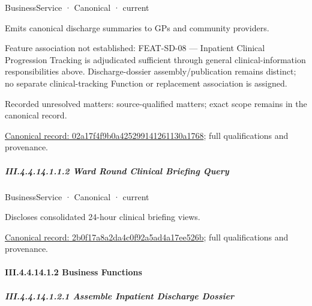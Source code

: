 \label{element:02a17f4f9b0a425299141261130a1768}
{\small BusinessService · Canonical · current}\par

Emits canonical discharge summaries to GPs and community providers.



Feature association not established: FEAT-SD-08 — Inpatient Clinical Progression Tracking is adjudicated sufficient through general clinical-information responsibilities above. Discharge-dossier assembly/publication remains distinct; no separate clinical-tracking Function or replacement association is assigned.


{\small Recorded unresolved matters: source-qualified matters; exact scope remains in the canonical record.}\par
{\footnotesize \href{../../../../../../../continuum/business/business-service/02a17f4f9b0a425299141261130a1768.md}{Canonical record: 02a17f4f9b0a425299141261130a1768}; full qualifications and provenance.}\par
\subparagraph*{III.4.4.14.1.1.2 Ward Round Clinical Briefing Query}
\label{navigation:III.4.4.14.1.1.2}

\label{element:2b0f17a8a2da4c0f92a5ad4a17ee526b}
{\small BusinessService · Canonical · current}\par

Discloses consolidated 24-hour clinical briefing views.


{\footnotesize \href{../../../../../../../continuum/business/business-service/2b0f17a8a2da4c0f92a5ad4a17ee526b.md}{Canonical record: 2b0f17a8a2da4c0f92a5ad4a17ee526b}; full qualifications and provenance.}\par
\paragraph*{III.4.4.14.1.2 Business Functions}
\label{navigation:III.4.4.14.1.2}

\subparagraph*{III.4.4.14.1.2.1 Assemble Inpatient Discharge Dossier}
\label{navigation:III.4.4.14.1.2.1}

